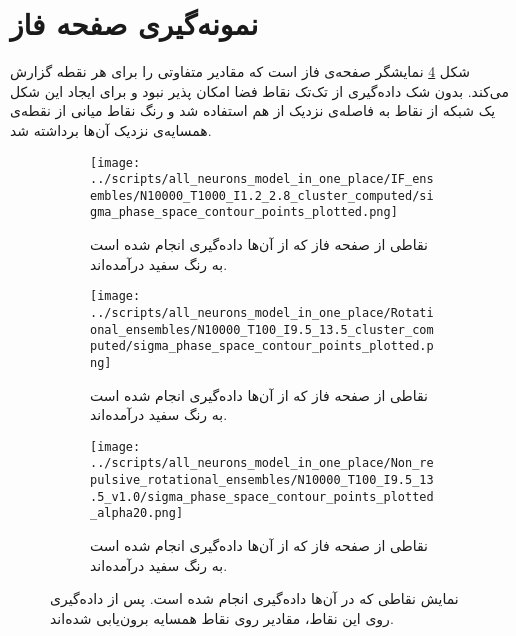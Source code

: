 \section{نمونه‌گیری صفحه فاز}
شکل \ref{appendix:fig:sampling_points} نمایشگر صفحه‌ی فاز است که مقادیر متفاوتی را برای هر نقطه گزارش می‌کند. بدون شک داده‌گیری از تک‌تک نقاط فضا امکان پذیر نبود و برای ایجاد این شکل یک شبکه از نقاط به فاصله‌ی نزدیک از هم استفاده شد و رنگ نقاط میانی از نقطه‌ی همسایه‌ی نزدیک آن‌ها برداشته شد.
\begin{figure}
	\begin{subfigure}{0.5\textwidth}
		\texttt{[image: ../scripts/all\_neurons\_model\_in\_one\_place/IF\_ensembles/N10000\_T1000\_I1.2\_2.8\_cluster\_computed/sigma\_phase\_space\_contour\_points\_plotted.png]}
		\caption{نقاطی از صفحه فاز که از آن‌ها داده‌گیری انجام شده است به رنگ سفید درآمده‌اند.}
		\label{fig:if_g_d_phase_if_space_points_plotted}
	\end{subfigure}
	\hfill
	\begin{subfigure}{0.5\textwidth}
		\texttt{[image: ../scripts/all\_neurons\_model\_in\_one\_place/Rotational\_ensembles/N10000\_T100\_I9.5\_13.5\_cluster\_computed/sigma\_phase\_space\_contour\_points\_plotted.png]}
		\caption{
			نقاطی از صفحه فاز که از آن‌ها داده‌گیری انجام شده است به رنگ سفید درآمده‌اند.
		}
		\label{fig:if_g_d_phase_rotational_space_points_plotted}
	\end{subfigure}
	\hfill
	\begin{subfigure}{0.5\textwidth}
		\texttt{[image: ../scripts/all\_neurons\_model\_in\_one\_place/Non\_repulsive\_rotational\_ensembles/N10000\_T100\_I9.5\_13.5\_v1.0/sigma\_phase\_space\_contour\_points\_plotted\_alpha20.png]}
		\caption{نقاطی از صفحه فاز که از آن‌ها داده‌گیری انجام شده است به رنگ سفید درآمده‌اند.}
		\label{fig:if_g_d_phase_space_Non_repulsive_points_plotted}
	\end{subfigure}
	\caption{نمایش نقاطی که در آن‌ها داده‌گیری انجام شده است. پس از داده‌گیری روی این نقاط، مقادیر روی نقاط همسایه برون‌یابی شده‌اند.}
	\label{appendix:fig:sampling_points}
\end{figure}